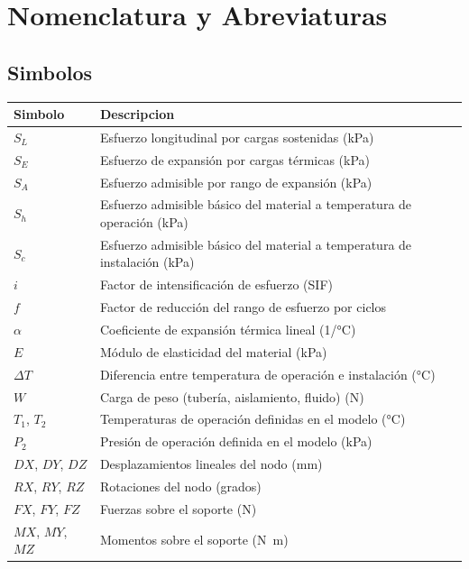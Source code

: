 \section*{Nomenclatura y Abreviaturas}

\subsection*{Simbolos}

\noindent\begin{tabularx}{\textwidth}{@{}l>{\raggedright\arraybackslash}X@{}}
	\toprule
	\textbf{Simbolo} & \textbf{Descripcion} \\
	\midrule
	$S_L$ & Esfuerzo longitudinal por cargas sostenidas (kPa) \\
	$S_E$ & Esfuerzo de expansi\'{o}n por cargas t\'{e}rmicas (kPa) \\
	$S_A$ & Esfuerzo admisible por rango de expansi\'{o}n (kPa) \\
	$S_h$ & Esfuerzo admisible b\'{a}sico del material a temperatura de operaci\'{o}n (kPa) \\
	$S_c$ & Esfuerzo admisible b\'{a}sico del material a temperatura de instalaci\'{o}n (kPa) \\
	$i$ & Factor de intensificaci\'{o}n de esfuerzo (SIF) \\
	$f$ & Factor de reducci\'{o}n del rango de esfuerzo por ciclos \\
	$\alpha$ & Coeficiente de expansi\'{o}n t\'{e}rmica lineal (1/\si{\celsius}) \\
	$E$ & M\'{o}dulo de elasticidad del material (kPa) \\
	$\Delta T$ & Diferencia entre temperatura de operaci\'{o}n e instalaci\'{o}n (\si{\celsius}) \\
	$W$ & Carga de peso (tuber\'{i}a, aislamiento, fluido) (N) \\
	$T_1$, $T_2$ & Temperaturas de operaci\'{o}n definidas en el modelo (\si{\celsius}) \\
	$P_2$ & Presi\'{o}n de operaci\'{o}n definida en el modelo (kPa) \\
	$DX$, $DY$, $DZ$ & Desplazamientos lineales del nodo (mm) \\
	$RX$, $RY$, $RZ$ & Rotaciones del nodo (grados) \\
	$FX$, $FY$, $FZ$ & Fuerzas sobre el soporte (N) \\
	$MX$, $MY$, $MZ$ & Momentos sobre el soporte (\si{N.m}) \\
	\bottomrule
\end{tabularx}

